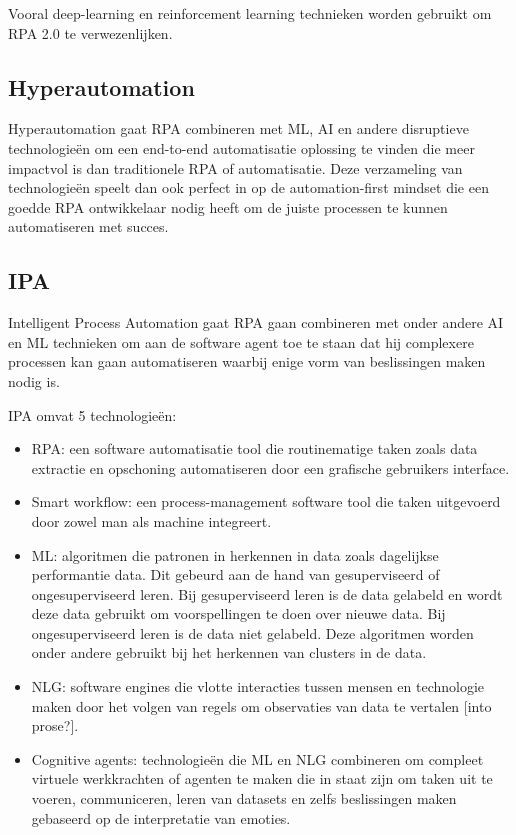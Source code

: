 Vooral deep-learning en reinforcement learning technieken worden gebruikt om RPA 2.0 te verwezenlijken. \autocite{idrRPA}

\subsection{Hyperautomation}
Hyperautomation gaat RPA combineren met ML, AI en andere disruptieve technologieën om een end-to-end automatisatie oplossing te vinden die meer impactvol is dan traditionele RPA of automatisatie. Deze verzameling van technologieën speelt dan ook perfect in op de automation-first mindset die een goedde RPA ontwikkelaar nodig heeft om de juiste processen te kunnen automatiseren met succes. \autocite{hyperautomation}

\subsection{IPA}
Intelligent Process Automation gaat RPA gaan combineren met onder andere AI en ML technieken om aan de software agent toe te staan dat hij complexere processen kan gaan automatiseren waarbij enige vorm van beslissingen maken nodig is.

IPA omvat 5 technologieën:
\begin{itemize}
	\item RPA: een software automatisatie tool die routinematige taken zoals data extractie en opschoning automatiseren door een grafische gebruikers interface.
	\item Smart workflow: een process-management software tool die taken uitgevoerd door zowel man als machine integreert.
	\item ML: algoritmen die patronen in herkennen in data zoals dagelijkse performantie data. Dit gebeurd aan de hand van gesuperviseerd of ongesuperviseerd leren. Bij gesuperviseerd leren is de data gelabeld en wordt deze data gebruikt om voorspellingen te doen over nieuwe data. Bij ongesuperviseerd leren is de data niet gelabeld. Deze algoritmen worden onder andere gebruikt bij het herkennen van clusters in de data.
	\item NLG: software engines die vlotte interacties tussen mensen en technologie maken door het volgen van regels om observaties van data te vertalen [into prose?].
	\item Cognitive agents: technologieën die ML en NLG combineren om compleet virtuele werkkrachten of agenten te maken die in staat zijn om taken uit te voeren, communiceren, leren van datasets en zelfs beslissingen maken gebaseerd op de interpretatie van emoties.
\end{itemize}


